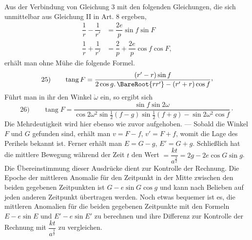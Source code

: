 Aus der Verbindung von Gleichung 3 mit den folgenden Gleichungen, die sich unmittelbar aus Gleichung II in Art. 8 ergeben,
\[
\begin{aligned}
\dfrac1r-\dfrac1{r'}&=\dfrac{2e}{p}\sin f\sin F\\[6pt]
\dfrac1r+\dfrac1{r'}&=\dfrac2p+\dfrac{2e}{p}\cos f\cos F,
\end{aligned}
\]
erhält man ohne Mühe die folgende Formel.
\[
\mathrm{25)}\qquad \operatorname{tang}F=\dfrac{(r'-r)\sin f}{2\cos g\mathpunct{.}\BareRoot{rr'}-(r'+r)\cos f}\mathpunct{\raisebox{.45ex}{,}}
\]
Führt man in ihr den Winkel $\grave{\omega}$ ein, so ergibt sich
\[
\mathrm{26)}\qquad \operatorname{tang}F=\dfrac{\sin f\sin 2\omega}{\cos 2\omega^2\sin\frac12(f-g)\sin\frac12(f+g)-\sin 2\omega^2\cos f}\mathpunct{\cdot}
\]
Die Mehrdeutigkeit wird hier ebenso wie zuvor aufgehoben. — Sobald die Winkel $F$ und $G$ gefunden sind, erhält man $v=F-f$, $v'=F+f$, womit die Lage des Perihels bekannt ist. Ferner erhält man $E=G-g$, $E'=G+g$. Schließlich hat die mittlere Bewegung während der Zeit $t$ den Wert $=\dfrac{kt}{a^{\frac32}}=2g-2e\cos G\sin g$. Die Übereinstimmung dieser Ausdrücke dient zur Kontrolle der Rechnung. Die Epoche der mittleren Anomalie für den Zeitpunkt in der Mitte zwischen den beiden gegebenen Zeitpunkten ist $G-e\sin G\cos g$ und kann nach Belieben auf jeden anderen Zeitpunkt übertragen werden. Noch etwas bequemer ist es, die mittleren Anomalien für die beiden gegebenen Zeitpunkte mit den Formeln $E-e\sin E$ und $E'-e\sin E'$ zu berechnen und ihre Differenz zur Kontrolle der Rechnung mit $\dfrac{kt}{a^{\frac32}}$ zu vergleichen.

